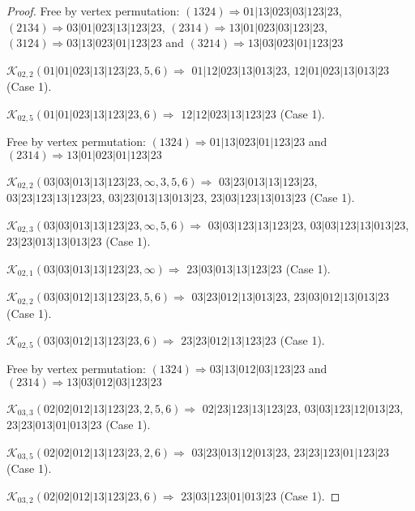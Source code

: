 \documentclass[12pt]{article}
\theoremstyle{plain}
\theoremstyle{definition}
\theoremstyle{remark}
\newcommand{\fancy}[1]{\mathcal{#1}}
\def\K{\fancy{K}}
\begin{document}
\begin{proof}
	
	
	Free by vertex permutation: $(1 3 2 4)\Rightarrow 01|13|023|03|123|23$, $(2 1 3 4)\Rightarrow 03|01|023|13|123|23$, $(2 3 1 4)\Rightarrow 13|01|023|03|123|23$, $(3 1 2 4)\Rightarrow 03|13|023|01|123|23$ and $(3 2 1 4)\Rightarrow 13|03|023|01|123|23$
	
	
	
	\bigskip
	
	$\K_{02,2}(01|01|023|13|123|23,5, 6)\Rightarrow $ $01|12|023|13|013|23$, $12|01|023|13|013|23$ (Case 1).
	
	$\K_{02,5}(01|01|023|13|123|23,6)\Rightarrow $ $12|12|023|13|123|23$ (Case 1).
	
	
	
	Free by vertex permutation: $(1 3 2 4)\Rightarrow 01|13|023|01|123|23$ and $(2 3 1 4)\Rightarrow 13|01|023|01|123|23$
	
	
	
	\bigskip
	
	$\K_{02,2}(03|03|013|13|123|23,\infty,3, 5, 6)\Rightarrow $ $03|23|013|13|123|23$, $03|23|123|13|123|23$, $03|23|013|13|013|23$, $23|03|123|13|013|23$ (Case 1).
	
	$\K_{02,3}(03|03|013|13|123|23,\infty,5, 6)\Rightarrow $ $03|03|123|13|123|23$, $03|03|123|13|013|23$, $23|23|013|13|013|23$ (Case 1).
	
	$\K_{02,1}(03|03|013|13|123|23,\infty)\Rightarrow $ $23|03|013|13|123|23$ (Case 1).
	
	
	\bigskip
	
	$\K_{02,2}(03|03|012|13|123|23,5, 6)\Rightarrow $ $03|23|012|13|013|23$, $23|03|012|13|013|23$ (Case 1).
	
	$\K_{02,5}(03|03|012|13|123|23,6)\Rightarrow $ $23|23|012|13|123|23$ (Case 1).
	
	
	
	Free by vertex permutation: $(1 3 2 4)\Rightarrow 03|13|012|03|123|23$ and $(2 3 1 4)\Rightarrow 13|03|012|03|123|23$
	
	
	
	\bigskip
	
	$\K_{03,3}(02|02|012|13|123|23,2, 5, 6)\Rightarrow $ $02|23|123|13|123|23$, $03|03|123|12|013|23$, $23|23|013|01|013|23$ (Case 1).
	
	$\K_{03,5}(02|02|012|13|123|23,2, 6)\Rightarrow $ $03|23|013|12|013|23$, $23|23|123|01|123|23$ (Case 1).
	
	$\K_{03,2}(02|02|012|13|123|23,6)\Rightarrow $ $23|03|123|01|013|23$ (Case 1).
	
	
	

\end{proof}
\end{document}
